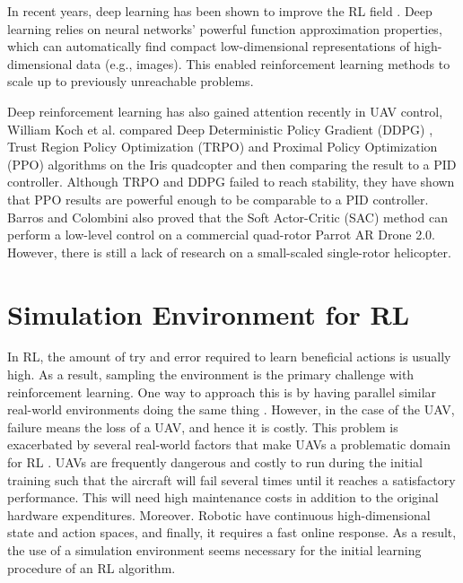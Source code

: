In recent years, deep learning has been shown to improve the RL field \cite{li2017deep}. Deep learning relies on neural networks' powerful function approximation properties, which can automatically find compact low-dimensional representations of high-dimensional data (e.g., images). This enabled reinforcement learning methods to scale up to previously unreachable problems. 

Deep reinforcement learning has also gained attention recently in UAV control, William Koch et al. \cite{koch2019reinforcement} compared Deep Deterministic Policy Gradient (DDPG) \cite{lillicrap2015continuous}, Trust Region Policy Optimization (TRPO) \cite{schulman2015trust} and Proximal Policy Optimization (PPO) \cite{schulman2017proximal} algorithms on the Iris quadcopter and then comparing the result to a PID controller. Although TRPO and DDPG failed to reach stability, they have shown that PPO results are powerful enough to be comparable to a PID controller. Barros and Colombini \cite{barros2020using} also proved that the Soft Actor-Critic (SAC) \cite{haarnoja2018soft} method can perform a low-level control on a commercial quad-rotor Parrot AR Drone 2.0. However, there is still a lack of research on a small-scaled single-rotor helicopter. 

\section{Simulation Environment for RL}

In RL, the amount of try and error required to learn beneficial actions is usually high. As a result, sampling the environment is the primary challenge with reinforcement learning. One way to approach this is by having parallel similar real-world environments doing the same thing \cite{levine2018learning}. However, in the case of the UAV, failure means the loss of a UAV, and hence it is costly. This problem is exacerbated by several real-world factors that make UAVs a problematic domain for RL \cite{kober2013reinforcement}. UAVs are frequently dangerous and costly to run during the initial training such that the aircraft will fail several times until it reaches a satisfactory performance. This will need high maintenance costs in addition to the original hardware expenditures. Moreover. Robotic have continuous high-dimensional state and action spaces, and finally, it requires a fast online response. As a result, the use of a simulation environment seems necessary for the initial learning procedure of an RL algorithm. 

